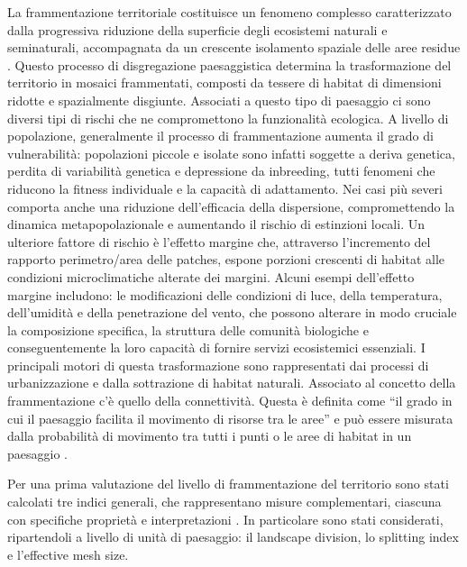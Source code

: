 \documentclass[
  a4paper,
]{book}
\begin{document}
La frammentazione territoriale costituisce un fenomeno complesso caratterizzato dalla progressiva riduzione della superficie degli ecosistemi naturali e seminaturali, accompagnata da un crescente isolamento spaziale delle aree residue \citep{puttkerIndirectEffectsHabitat2020, lawrenceLandscapeFragmentationNatura2021, simaikaArtificialPondsIncrease2016}.
Questo processo di disgregazione paesaggistica determina la trasformazione del territorio in mosaici frammentati, composti da tessere di habitat di dimensioni ridotte e spazialmente disgiunte.
Associati a questo tipo di paesaggio ci sono diversi tipi di rischi che ne compromettono la funzionalità ecologica.
A livello di popolazione, generalmente il processo di frammentazione aumenta il grado di vulnerabilità: popolazioni piccole e isolate sono infatti soggette a deriva genetica, perdita di variabilità genetica e depressione da inbreeding, tutti fenomeni che riducono la fitness individuale e la capacità di adattamento.
Nei casi più severi comporta anche una riduzione dell'efficacia della dispersione, compromettendo la dinamica metapopolazionale e aumentando il rischio di estinzioni locali.
Un ulteriore fattore di rischio è l'effetto margine che, attraverso l'incremento del rapporto perimetro/area delle patches, espone porzioni crescenti di habitat alle condizioni microclimatiche alterate dei margini.
Alcuni esempi dell'effetto margine includono: le modificazioni delle condizioni di luce, della temperatura, dell'umidità e della penetrazione del vento, che possono alterare in modo cruciale la composizione specifica, la struttura delle comunità biologiche e conseguentemente la loro capacità di fornire servizi ecosistemici essenziali.
I principali motori di questa trasformazione sono rappresentati dai processi di urbanizzazione e dalla sottrazione di habitat naturali.
Associato al concetto della frammentazione c'è quello della connettività.
Questa è definita come ``il grado in cui il paesaggio facilita il movimento di risorse tra le aree'' e può essere misurata dalla probabilità di movimento tra tutti i punti o le aree di habitat in un paesaggio \citep{taylorConnectivityVitalElement1993}.

Per una prima valutazione del livello di frammentazione del territorio sono stati calcolati tre indici generali, che rappresentano misure complementari, ciascuna con specifiche proprietà e interpretazioni \citep{jaegerLandscapeDivisionSplitting2000}.
In particolare sono stati considerati, ripartendoli a livello di unità di paesaggio: il landscape division, lo splitting index e l'effective mesh size.
\end{document}
